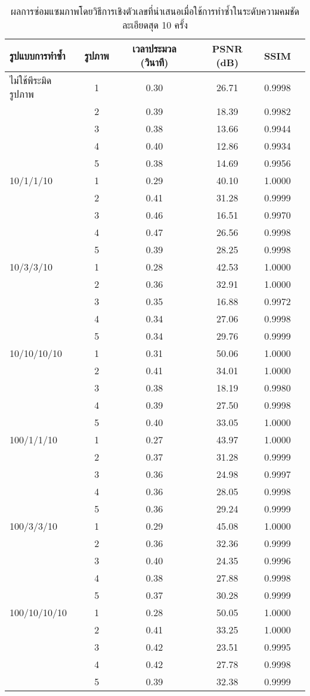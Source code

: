 \begin{table}[H]
    \centering
	\small
	\begin{tabular}[ht]{|l|c|c|c|c|c|}
		\hline
		รูปแบบการทำซ้ำ  & รูปภาพ &เวลาประมวล  (วินาที) & PSNR (dB) & SSIM \\
		\hline
		ไม่ใช้พีระมิดรูปภาพ & 1 & 0.30  & 26.71  & 0.9998 \\ 
		& 2 & 0.39  & 18.39  & 0.9982 \\
		& 3 & 0.38 & 13.66  & 0.9944 \\
		& 4 & 0.40  & 12.86 & 0.9934 \\
		& 5 & 0.38 & 14.69 &  0.9956\\
		\hline
		10/1/1/10 & 1 & 0.29 & 40.10 & 1.0000\\
		& 2 & 0.41 & 31.28 & 0.9999 \\
		& 3 & 0.46 & 16.51 & 0.9970 \\
		& 4 & 0.47 & 26.56 & 0.9998\\
		& 5 & 0.39 & 28.25 & 0.9998 \\
		\hline
		10/3/3/10  & 1 & 0.28 & 42.53 & 1.0000\\
		& 2 & 0.36 & 32.91 & 1.0000 \\
		& 3 & 0.35 & 16.88 & 0.9972 \\
		& 4 & 0.34 & 27.06 &  0.9998 \\
		& 5 & 0.34 & 29.76 & 0.9999 \\
		\hline
		10/10/10/10  & 1 & 0.31 & 50.06 & 1.0000 \\
		& 2 & 0.41 & 34.01 & 1.0000\\
		& 3 & 0.38 & 18.19 & 0.9980\\
		& 4 & 0.39 & 27.50 & 0.9998\\
		& 5 & 0.40 & 33.05 &  1.0000\\
		\hline
		100/1/1/10  & 1 & 0.27 & 43.97 & 1.0000 \\
		& 2 & 0.37  & 31.28 & 0.9999\\
		& 3 & 0.36 & 24.98 & 0.9997\\
		& 4 & 0.36  &28.05 & 0.9998\\
		& 5 & 0.36 & 29.24 & 0.9999 \\
		\hline
		100/3/3/10  & 1 & 0.29 & 45.08& 1.0000 \\
		& 2 & 0.36 & 32.36 & 0.9999\\
		& 3 & 0.40 & 24.35 & 0.9996\\
		& 4 & 0.38 & 27.88 & 0.9998\\
		& 5 & 0.37 & 30.28 & 0.9999 \\
		\hline
		100/10/10/10  & 1 & 0.28 & 50.05 &  1.0000\\
		& 2 & 0.41 & 33.25 &  1.0000\\
		& 3 & 0.42 & 23.51 & 0.9995 \\
		& 4 & 0.42 & 27.78 & 0.9998 \\
		& 5 & 0.39 & 32.38 & 0.9999 \\
		\hline
	\end{tabular}
	\caption{ผลการซ่อมแซมภาพโดยวิธีการเชิงตัวเลขที่นำเสนอเมื่อใช้การทำซ้ำในระดับความคมชัดละเอียดสุด 10 ครั้ง}
	\label{table:multiresolution2}
\end{table}	